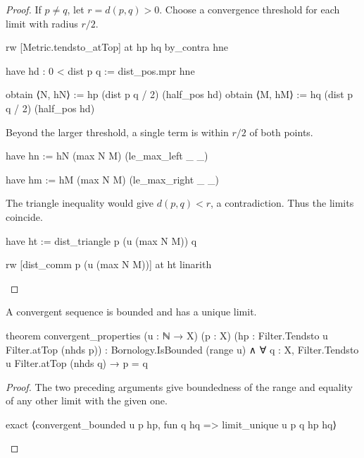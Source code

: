 \begin{proof}
  If $p\ne q$, let $r=d(p,q)>0$.
  Choose a convergence threshold for each limit with radius $r/2$.

  \begin{lean}
    rw [Metric.tendsto_atTop] at hp hq
    by_contra hne

    have hd : 0 < dist p q := dist_pos.mpr hne

    obtain ⟨N, hN⟩ := hp (dist p q / 2) (half_pos hd)
    obtain ⟨M, hM⟩ := hq (dist p q / 2) (half_pos hd)
  \end{lean}

  Beyond the larger threshold, a single term is within $r/2$ of both points.

  \begin{lean}
    have hn := hN (max N M) (le_max_left _ _)

    have hm := hM (max N M) (le_max_right _ _)
  \end{lean}

  The triangle inequality would give $d(p,q)<r$, a contradiction.
  Thus the limits coincide.

  \begin{lean}
    have ht := dist_triangle p (u (max N M)) q

    rw [dist_comm p (u (max N M))] at ht
    linarith
  \end{lean}
\end{proof}

\begin{proposition}
  \label{ma:thm:convergent-sequence-is-bounded}
  A convergent sequence is bounded and has a unique limit.

  \begin{lean}
    theorem convergent_properties (u : ℕ → X) (p : X) (hp : Filter.Tendsto u Filter.atTop (nhds p)) :
        Bornology.IsBounded (range u) ∧ ∀ q : X, Filter.Tendsto u Filter.atTop (nhds q) → p = q
  \end{lean}
\end{proposition}

\begin{proof}
  The two preceding arguments give boundedness of the range and equality of any other limit with
  the given one.

  \begin{lean}
    exact ⟨convergent_bounded u p hp, fun q hq => limit_unique u p q hp hq⟩
  \end{lean}

\end{proof}

